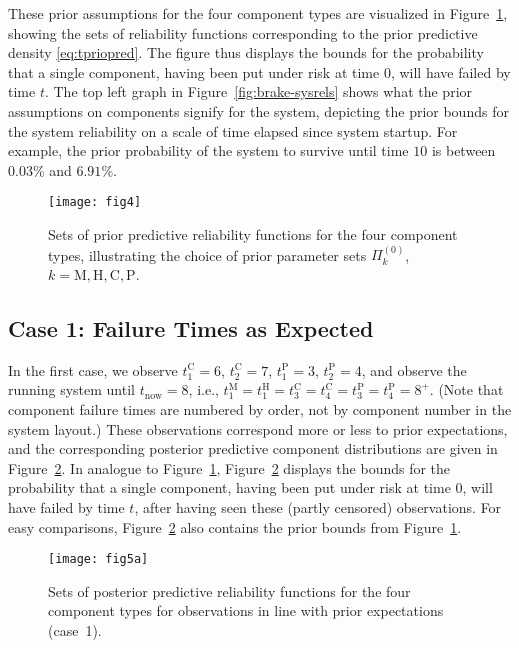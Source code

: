 \documentclass[Journal,letterpaper]{ascelike-new}
\newcommand{\uz}{^{(0)}} %
\def\PkZ{\Pi\uz_k}
\def\tnow{t_\text{now}}
\begin{document}
These prior assumptions for the four component types are visualized in Figure~\ref{fig:brake-comppriors},
showing the sets of reliability functions corresponding to the prior predictive density \eqref{eq:tpriopred}.
The figure thus displays the bounds for the probability that a single component,
having been put under risk at time $0$, will have failed by time $t$.
The top left graph in Figure~\ref{fig:brake-sysrels} shows what the prior assumptions on components
signify for the system, depicting the prior bounds for the system reliability %
on a scale of time elapsed since system startup.
For example, the prior probability of the system to survive until time $10$ is between $0.03$\% and $6.91$\%.

\begin{figure}
\texttt{[image: fig4]}
\caption{Sets of prior predictive reliability functions for the four component types,
illustrating the choice of prior parameter sets $\PkZ$, $k=\text{M}, \text{H}, \text{C}, \text{P}$.}
\label{fig:brake-comppriors}
\end{figure}


\subsection{Case 1: Failure Times as Expected}
\label{sec:ex-case1}

In the first case, we observe $t_1^\text{C} = 6$, $t_2^\text{C} = 7$, $t_1^\text{P} = 3$, $t_2^\text{P} = 4$,
and observe the running system until $\tnow = 8$,
i.e., $t_1^\text{M} = t_1^\text{H} = t_3^\text{C} = t_4^\text{C} = t_3^\text{P} = t_4^\text{P} = 8^+$.
(Note that component failure times are numbered by order, not by component number in the system layout.)
These observations correspond more or less to prior expectations,
and the corresponding posterior predictive component distributions are given in Figure~\ref{fig:comppost-1}.
In analogue to Figure~\ref{fig:brake-comppriors},
Figure~\ref{fig:comppost-1} displays the bounds for the probability that a single component,
having been put under risk at time $0$, will have failed by time $t$,
after having seen these (partly censored) observations.
For easy comparisons, Figure~\ref{fig:comppost-1} also contains the prior bounds from Figure~\ref{fig:brake-comppriors}.

\begin{figure}
\texttt{[image: fig5a]}
\caption{Sets of posterior predictive reliability functions for the four component types
for observations in line with prior expectations (case~1).}
\label{fig:comppost-1}
\end{figure}
\end{document}
